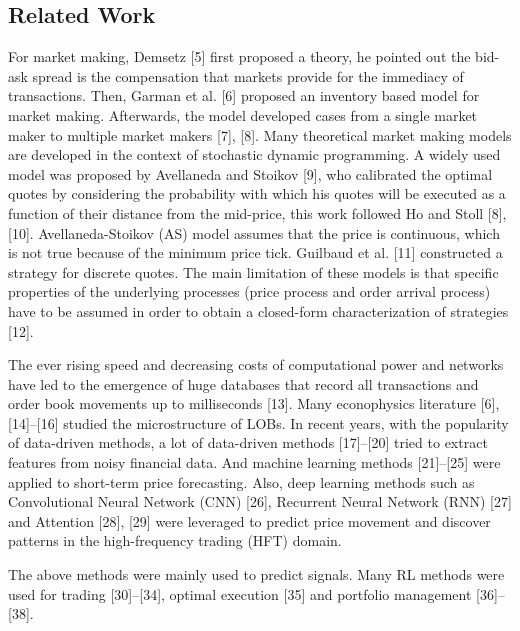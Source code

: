 \documentclass[conference]{IEEEtran}
\begin{document}
\subsection{Related Work}
For market making, Demsetz [5] first proposed a theory, he pointed out the bid-ask spread is the compensation that markets provide for the immediacy of transactions. Then, Garman et al. [6] proposed an inventory based model for market making. Afterwards, the model developed cases from a single market maker to multiple market makers [7], [8]. Many theoretical market making models are developed in the context of stochastic dynamic programming. A widely used model was proposed by Avellaneda and Stoikov [9], who calibrated the optimal quotes by considering the probability with which his quotes will be executed as a function of their distance from the mid-price, this work followed Ho and Stoll [8], [10]. Avellaneda-Stoikov (AS) model assumes that the price is continuous, which is not true because of the minimum price tick. Guilbaud et al. [11] constructed a strategy for discrete quotes. The main limitation of these models is that specific properties of the underlying processes (price process and order arrival process) have to be assumed in order to obtain a closed-form characterization of strategies [12].

The ever rising speed and decreasing costs of computational power and networks have led to the emergence of huge databases that record all transactions and order book movements up to milliseconds [13]. Many econophysics literature [6], [14]--[16] studied the microstructure of LOBs. In recent years, with the popularity of data-driven methods, a lot of data-driven methods [17]--[20] tried to extract features from noisy financial data. And machine learning methods [21]--[25] were applied to short-term price forecasting. Also, deep learning methods such as Convolutional Neural Network (CNN) [26], Recurrent Neural Network (RNN) [27] and Attention [28], [29] were leveraged to predict price movement and discover patterns in the high-frequency trading (HFT) domain.

The above methods were mainly used to predict signals. Many RL methods were used for trading [30]--[34], optimal execution [35] and portfolio management [36]--[38].
\end{document}

